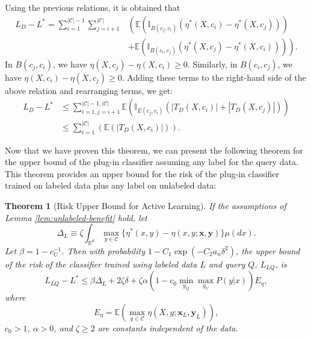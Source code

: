 \documentclass[12pt]{article}
\newtheorem{theorem}{Theorem}[section]
\begin{document}
	Using the previous relations, it is obtained that
	\begin{align}
		L_D - L^* = \sum_{i=1}^{|\mathcal{C}|-1} \sum_{j=i+1}^{|\mathcal{C}|} &\left( \mathbb{E}\left( \mathbb{I}_{B(c_j, c_i)} (\eta^*(X, c_i) - \eta^*(X, c_j)) \right) \right. \\
		&\left. + \mathbb{E}\left( \mathbb{I}_{B(c_i, c_j)} (\eta^*(X, c_j) - \eta^*(X, c_i)) \right) \right).
	\end{align}
	In $B(c_j, c_i)$, we have $\eta(X, c_j) - \eta(X, c_i) \ge 0$. Similarly, in $B(c_i, c_j)$, we have $\eta(X, c_i) - \eta(X, c_j) \ge 0$. Adding these terms to the right-hand side of the above relation and rearranging terms, we get:
	\begin{align}
		L_D - L^* &\le \sum_{i=1, j=i+1}^{|\mathcal{C}|-1, |\mathcal{C}|} \mathbb{E}\left( \mathbb{I}_{E(c_j, c_i)} (|T_D(X, c_i)| + |T_D(X, c_j)|) \right) \\
		&\le \sum_{i=1}^{|\mathcal{C}|} \left( \mathbb{E}(|T_D(X, c_i)|) \right).
	\end{align}
	
	Now that we have proven this theorem, we can present the following theorem for the upper bound of the plug-in classifier assuming any label for the query data. This theorem provides an upper bound for the risk of the plug-in classifier trained on labeled data plus any label on unlabeled data:
	
	\begin{theorem}[Risk Upper Bound for Active Learning]
		\label{thm:risk-upper-bound}
		If the assumptions of Lemma \ref{lem:unlabeled-benefit} hold, let
		\begin{equation}
			\Delta_L \equiv \zeta \int_{\mathbb{R}^d} \max_{y \in \mathcal{C}} \{\eta^*(x, y) - \eta(x, y; \mathbf{x}, \mathbf{y})\} \mu(dx).
		\end{equation}
		Let $\beta = 1 - c_U^{-1}$. Then with probability $1 - C_1 \exp(-C_2 a_n \delta^2)$, the upper bound of the risk of the classifier trained using labeled data $L$ and query $Q$, $L_{LQ}$, is
		\begin{equation}
			L_{LQ} - L^* \le \beta \Delta_L + 2\zeta \delta + \zeta \alpha \left( 1 - c_0 \min_{y_Q} \max_{y_U} P(y|x) \right) E_\eta,
		\end{equation}
		where
		\begin{equation}
			E_\eta = \mathbb{E}\left( \max_{y \in \mathcal{C}} \eta(X, y; \mathbf{x}_L, \mathbf{y}_L) \right),
		\end{equation}
		$c_0 > 1$, $\alpha > 0$, and $\zeta \ge 2$ are constants independent of the data.
	\end{theorem}
	
\end{document}
